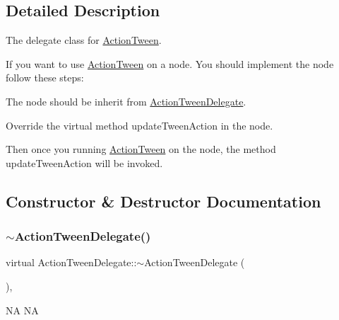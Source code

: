 \subsection{Detailed Description}
The delegate class for \hyperlink{classActionTween}{Action\+Tween}. 

If you want to use \hyperlink{classActionTween}{Action\+Tween} on a node. You should implement the node follow these steps\+:
\begin{DoxyEnumerate}
\item The node should be inherit from \hyperlink{classActionTweenDelegate}{Action\+Tween\+Delegate}.
\item Override the virtual method update\+Tween\+Action in the node.
\end{DoxyEnumerate}

Then once you running \hyperlink{classActionTween}{Action\+Tween} on the node, the method update\+Tween\+Action will be invoked. 

\subsection{Constructor \& Destructor Documentation}
\mbox{\label{classActionTweenDelegate_aafecfad24eba11952027e807af3405e0}} 
\subsubsection{\texorpdfstring{$\sim$\+Action\+Tween\+Delegate()}{~ActionTweenDelegate()}\hspace{0.1cm}{\footnotesize\ttfamily [1/2]}}
{\footnotesize\ttfamily virtual Action\+Tween\+Delegate\+::$\sim$\+Action\+Tween\+Delegate (\begin{DoxyParamCaption}{ }\end{DoxyParamCaption})\hspace{0.3cm}{\ttfamily [inline]}, {\ttfamily [virtual]}}

NA  NA \mbox{\label{classActionTweenDelegate_aafecfad24eba11952027e807af3405e0}} 
